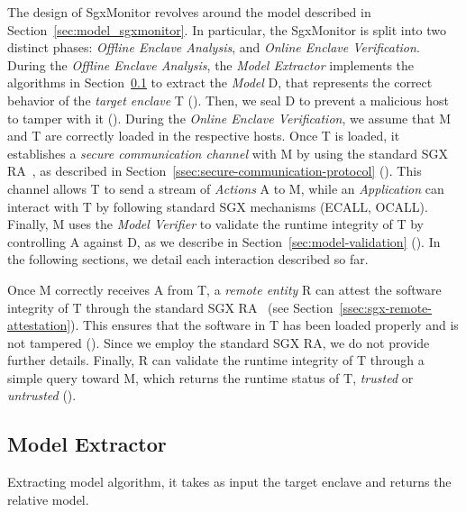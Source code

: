 The design of SgxMonitor revolves around the model described in 
Section~\ref{sec:model_sgxmonitor}.
In particular, the SgxMonitor is split into two distinct phases: 
\emph{Offline 
	Enclave Analysis}, and \emph{Online Enclave Verification}. 
During the \emph{Offline Enclave Analysis}, the \emph{Model Extractor} 
implements the algorithms in Section~\ref{sec:model-exctraction} to extract the 
\emph{Model} D, that represents the correct behavior of the \emph{target 	
	enclave} T (\circled[1]).
Then, we seal D to prevent a malicious host to tamper with it (\circled[2]).
During the \emph{Online Enclave Verification}, we assume that M and T are 
correctly loaded in the respective hosts.
Once T is loaded, it establishes a \emph{secure communication channel} with M 
by 
using the standard SGX RA~\citep{anati2013innovative}, as
described in Section~\ref{ssec:secure-communication-protocol} (\circled[3]).
This channel allows T to send a stream of \emph{Actions} A to M, 
while an \emph{Application} can interact with T by following standard SGX 
mechanisms (\eg ECALL, OCALL).
Finally, M uses the \emph{Model Verifier} to validate the runtime integrity 
of T by controlling A against D, as we describe in 
Section~\ref{sec:model-validation} (\circled[4]).
In the following sections, we detail each interaction described so far.

Once M correctly receives A from T, a \emph{remote entity} R can attest the 
software integrity of T through the standard SGX RA~\citep{anati2013innovative} 
(see Section~\ref{ssec:sgx-remote-attestation}). This ensures that the software 
in T has been loaded properly and is not tampered  (\circled[5]).
Since we employ the standard SGX RA, we do not provide further details.
Finally, R can validate the runtime integrity of T through a simple query 
toward M, which returns the runtime status of T, \ie \emph{trusted} or 
\emph{untrusted} (\circled[6]).


\subsection{Model Extractor}
\label{sec:model-exctraction}

\begin{algorithm}[t]
	\SetAlgoLined
	\DontPrintSemicolon
	\caption{Extracting model algorithm, it takes as input the target enclave 
		and returns the relative model.}
	\label{alg:model-extractor}
\end{algorithm}

